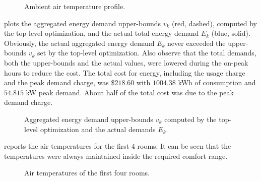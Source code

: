 \begin{figure}[tb]
  \centering
  
  \caption{Ambient air temperature profile.}
    \vspace{-10pt}
  \label{fig:simulation:ambient}
\end{figure}

 plots the aggregated energy demand upper-bounds $v_{k}$ (red, dashed), computed by the top-level optimization, and the actual total energy demand $E_{k}$ (blue, solid).
Obviously, the actual aggregated energy demand $E_{k}$ never exceeded the upper-bounds $v_{k}$ set by the top-level optimization.
Also observe that the total demands, both the upper-bounds and the actual values, were lowered during the on-peak hours to reduce the cost.
The total cost for energy, including the usage charge and the peak demand charge, was $\$218.60$ with $1004.38$ kWh of consumption and $54.815$ kW peak demand.
About half of the total cost was due to the peak demand charge.

\begin{figure}[tb]
  \centering
  
  \caption{Aggregated energy demand upper-bounds $v_{k}$ computed by the top-level optimization and the actual demands $E_{k}$.}
    \vspace{-10pt}
  \label{fig:simulation:demand}
\end{figure}


 reports the air temperatures for the first 4 rooms.
It can be seen that the temperatures were always maintained inside the required comfort range.

\begin{figure}[tb]
  \centering
  
  \caption{Air temperatures of the first four rooms.}
  \label{fig:simulation:temp}
\end{figure}


